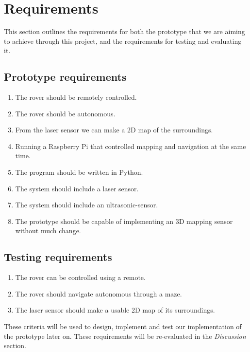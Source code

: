 \section{Requirements}

This section outlines the requirements for both the prototype that we are aiming to achieve through this project, and the requirements for testing and evaluating it.

\subsection{Prototype requirements}

\begin{enumerate}
	
	\item The rover should be remotely controlled.
	\item The rover should be autonomous.
	\item From the laser sensor we can make a 2D map of the surroundings.
	\item Running a Raspberry Pi that controlled mapping and navigation at the same time.
	\item The program should be written in Python.
	\item The system should include a laser sensor.
	\item The system should include an ultrasonic-sensor.
 	\item The prototype should be capable of implementing an 3D mapping sensor without much change.
	
\end{enumerate}

\subsection{Testing requirements}

\begin{enumerate}
	
	\item The rover can be controlled using a remote.
	\item The rover should navigate autonomous through a maze.
	\item The laser sensor should make a usable 2D map of its surroundings.
	
\end{enumerate}

These criteria will be used to design, implement and test our implementation of the prototype later on. These requirements will be re-evaluated in the \textit{Discussion} section.